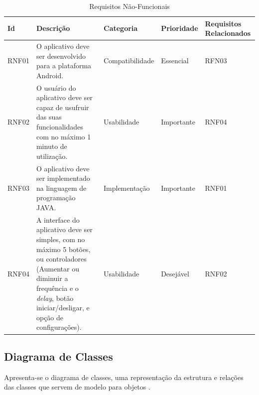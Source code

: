 \begin{table}[H]
	\caption{Requisitos N\~ao-Funcionais}\label{tab:reqnaofuncionais}
	\centering
	\begin{tabular}{|p{1.0cm}|p{5.0cm}|p{2.5cm}|p{2.0cm}|p{2.5cm}|}
		\hline
		\textbf{Id} & \textbf{Descri\c{c}\~ao}& \textbf{Categoria} & \textbf{Prioridade} & \textbf{Requisitos Relacionados}\\
		\hline
		RNF01 & O aplicativo deve ser desenvolvido para a plataforma Android. & Compatibilidade & Essencial & RFN03\\
		\hline
		RNF02 & O usu\'ario do aplicativo deve ser capaz de usufruir das suas funcionalidades com no m\'aximo 1 minuto de utiliza\c{c}\~ao. & Usabilidade & Importante & RNF04 \\
		\hline
		RNF03 & O aplicativo deve ser implementado na linguagem de programa\c{c}\~ao JAVA. & Implementa\c{c}\~ao  & Importante & RNF01\\
		\hline
		RNF04 & A interface do aplicativo deve ser simples, com no m\'aximo 5 bot\~oes, ou controladores (Aumentar ou diminuir a frequ\^encia e o \textit{delay}, bot\~ao iniciar/desligar, e op\c{c}\~ao de configura\c{c}\~oes). & Usabilidade & Desej\'avel & RNF02\\
		\hline
	\end{tabular}
\end{table}


\subsection{Diagrama de Classes}

Apresenta-se o diagrama de classes, uma representa\c{c}\~ao da estrutura e rela\c{c}\~oes das classes que servem de modelo para objetos \cite{Tybel2017}.

